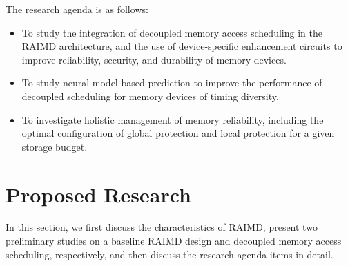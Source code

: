 \documentclass[11pt]{article}
\begin{document}
%

The research agenda is as follows:

\begin{itemize}

\item  To study the integration of decoupled memory access scheduling in the
RAIMD architecture, and the use of device-specific enhancement circuits to
improve reliability, security, and durability of memory devices.

\item To study neural model based prediction to improve the performance of
decoupled scheduling for memory devices of timing diversity.

\item To investigate holistic management of memory reliability, including the
optimal configuration of global protection and local protection for a given
storage budget.

\end{itemize}

\section{Proposed Research}

In this section, we first discuss the characteristics of RAIMD, present two
preliminary studies on a baseline RAIMD design and decoupled memory access
scheduling, respectively, and then discuss the research agenda items in detail.
\end{document}
